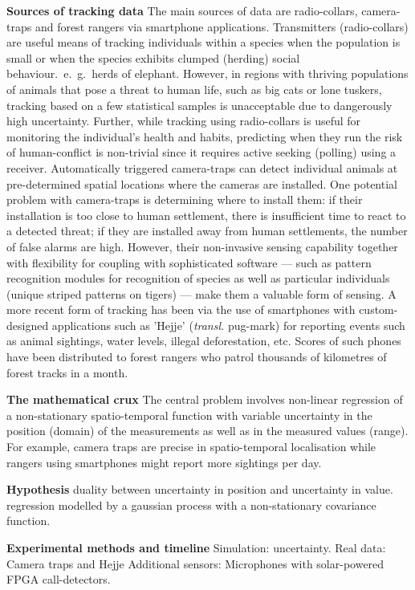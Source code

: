 \documentclass[a4paper,10pt,twocolumn]{article}
\newcommand{\hdg}[1] {\noindent \textbf{#1} }
\begin{document}
\hdg{Sources of tracking data}
The main sources of data are radio-collars, camera-traps and forest rangers via smartphone applications. 
Transmitters (radio-collars) are useful means of tracking individuals within a species when the population is small or when the species exhibits clumped (herding) social behaviour.~e.~g.~herds of elephant. However, in regions with thriving populations of animals that pose a threat to human life, such as big cats or lone tuskers, tracking based on a few statistical samples is unacceptable due to dangerously high uncertainty. Further, while tracking using radio-collars is useful for monitoring the individual's health and habits, predicting when they run the risk of human-conflict is non-trivial since it requires active seeking (polling) using a receiver. 
% 
Automatically triggered camera-traps can detect individual animals at pre-determined spatial locations where the cameras are installed. One potential problem with camera-traps is determining where to install them: if their installation is too close to human settlement, there is insufficient time to react to a detected threat; if they are installed away from human settlements, the number of false alarms are high. However, their non-invasive sensing capability together with flexibility for coupling with sophisticated software --- such as pattern recognition modules for recognition of species as well as particular individuals (unique striped patterns on tigers) --- make them a valuable form of sensing.
% 
A more recent form of tracking has been via the use of smartphones with custom-designed applications such as 'Hejje' (\textit{transl.} pug-mark) for reporting events such as animal sightings, water levels, illegal deforestation, etc. Scores of such phones have been distributed to forest rangers who patrol thousands of kilometres of forest tracks in a month. 


\hdg{The mathematical crux} The central problem involves non-linear regression of a non-stationary spatio-temporal function with variable uncertainty in the position (domain) of the measurements as well as in the measured values (range). For example, camera traps are precise in spatio-temporal localisation while rangers using smartphones might report more sightings per day. 

\hdg{Hypothesis}
duality between uncertainty in position and uncertainty in value.
regression modelled by a gaussian process with a non-stationary covariance function.

\hdg{Experimental methods and timeline}
Simulation: uncertainty.
Real data: Camera traps and Hejje
Additional sensors: Microphones with solar-powered FPGA call-detectors.
\end{document}
